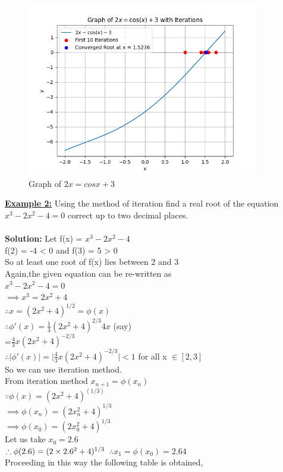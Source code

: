\documentclass[12pt,a4paper]{article}
\begin{document}
	\begin{figure}[h]
		\centering
		\includegraphics[width=0.9\textwidth]{iterative_ex2.png} %
		\caption{Graph of $2x = cos x + 3$}
		\label{fig:your_label_here}
	\end{figure} 
	
	
	\textbf{\underline{Example 2:}} Using the method of iteration find a real root of the equation $x^3-2x^2-4=0$ correct up to two decimal places. \\ \\
	
	\textbf{Solution:} Let f(x) = $x^3-2x^2-4$ \\
	f(2) = -4 < 0 and f(3) = 5 > 0 \\
	So at least one root of f(x) lies between 2 and 3 \\
	Again,the given equation can be re-written as \\
	$ x^3-2x^2-4=0$ \\
	$\implies x^3= 2x^2+4 $ \\
	
	$\therefore x = (2x^2+4)^{1/2} = \phi(x)$\\
	$\therefore \phi'(x)= \frac{1}{3} (2x^2+4)^{2/3} 4x$ (say) \\
	=$\frac{4}{3}x(2x^2+4)^{-2/3}$ \\
	$\therefore \lvert \phi'(x) \rvert = \lvert \frac{4}{3}x(2x^2 + 4)^{-2/3} \lvert < 1$ for all x $\in[2,3]$ \\
	So we can use iteration method. \\
	From iteration method $x_{n+1} = \phi(x_n)$ \\
	$\because \phi(x) = (2x^2+4)^(1/3)$\\
	$\implies \phi(x_n)=(2x_n^2+4)^{1/3}$\\
	$\implies \phi(x_0)=(2x_0^2+4)^{1/3}$\\
	Let us take $x_0 = 2.6$\\
	$\therefore \phi(2.6)=(2 \times 2.6^2+4)^{1/3} \\$
	$\therefore x_1 = \phi(x_0)=2.64$ \\
	Proceeding in this way the following table is obtained, 
	
\end{document}

